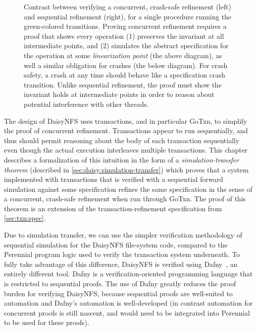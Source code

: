 \begin{figure}
\begin{subfigure}[m]{0.4\textwidth}
  \label{fig:refinement:seq}
  \end{subfigure}
  \vspace{0.5\baselineskip}
  \caption[Concurrent, crash-safe simulation vs sequential simulation]{Contrast between verifying a
    concurrent, crash-safe refinement (left) and sequential refinement (right), for a single
    procedure running the green-colored transitions. Proving concurrent
    refinement requires a proof that shows every operation (1) preserves the
    invariant at all intermediate points, and (2) simulates the abstract
    specification for the operation at some \emph{linearization point} (the
    above diagram), as well
    a similar obligation for crashes (the below diagram). For
    crash safety, a crash at any time should behave like a specification crash transition. Unlike
    sequential refinement, the proof must show the invariant holds at
    intermediate points in order to reason about potential interference with
    other threads.}

  \label{fig:concurrent-refinement}
\end{figure}


The design of DaisyNFS uses transactions, and in particular GoTxn, to simplify
the proof of concurrent refinement. Transactions appear to run
sequentially, and thus should permit reasoning about the body of each
transaction sequentially even though the actual execution interleaves multiple
transactions. This chapter describes a formalization of this intuition in the
form of a \emph{simulation-transfer theorem} (described in
\cref{sec:daisy:simulation-transfer}) which proves that a system implemented
with transactions that is verified with a sequential forward simulation against
some specification refines the same specification in the sense of a concurrent,
crash-safe refinement when run through GoTxn. The proof of this theorem is an
extension of the transaction-refinement specification from \cref{sec:txn:spec}.

Due to simulation transfer, we can use the simpler verification
methodology of sequential simulation for the DaisyNFS file-system code, compared
to the Perennial program logic used to verify the transaction system underneath.
To fully take advantage of this difference, DaisyNFS is verified using
Dafny~\cite{leino:dafny}, an entirely different tool. Dafny is a
verification-oriented programming language that is restricted to sequential
proofs. The use of Dafny greatly reduces the proof burden for verifying
DaisyNFS, because sequential proofs are well-suited to automation and Dafny's
automation is well-developed (in contrast automation for concurrent proofs is
still nascent, and would need to be integrated into Perennial to be used for
these proofs).

